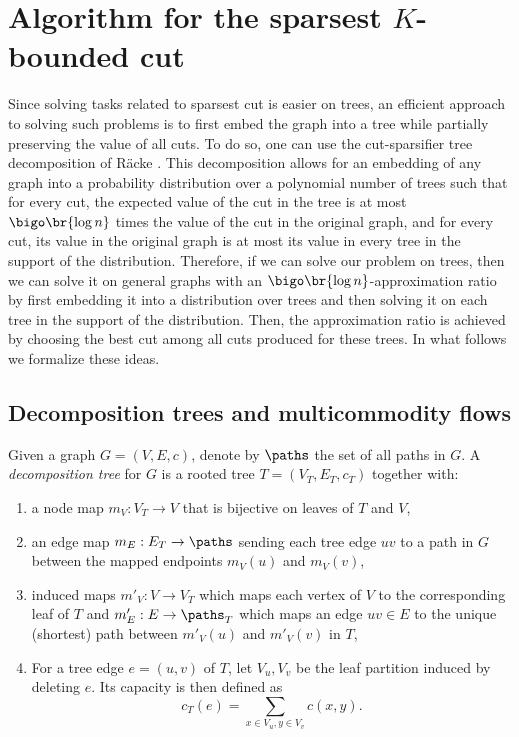 ﻿\section{Algorithm for the sparsest $K$-bounded cut}
\label{sec:alpha}

Since solving tasks related to sparsest cut is easier on trees, an efficient approach to solving such problems is to first embed the graph into a tree while partially preserving the value of all cuts. To do so, one can use the cut-sparsifier tree decomposition of R\"{a}cke \cite{OptimalHierarchicalDecompositionsForCongestionMinimizationInNetworks}. This decomposition allows for an embedding of any graph into a probability distribution over a polynomial number of trees such that for every cut, the expected value of the cut in the tree is at most $\bigo\br{\log n}$ times the value of the cut in the original graph, and for every cut, its value in the original graph is at most its value in every tree in the support of the distribution. Therefore, if we can solve our problem on trees, then we can solve it on general graphs with an $\bigo\br{\log n}$-approximation ratio by first embedding it into a distribution over trees and then solving it on each tree in the support of the distribution. Then, the approximation ratio is achieved by choosing the best cut among all cuts produced for these trees. In what follows we formalize these ideas.


\subsection{Decomposition trees and multicommodity flows}
Given a graph $G=(V,E,c)$, denote by $\paths$ the set of all paths in $G$.
A \emph{decomposition tree} for $G$ is a rooted tree
$T=(V_T,E_T, c_T)$ together with:
\begin{enumerate}
  \item a node map $m_V:V_T\to V$ that is bijective on leaves of $T$ and $V$,
  \item an edge map $m_E:E_T\to \paths$ sending each tree edge $uv$ to a path in $G$
  between the mapped endpoints $m_V(u)$ and $m_V(v)$,
  \item induced maps $m'_V:V\to V_T$ which maps each vertex of $V$ to the corresponding leaf of $T$ and $m'_E:E\to \paths_T$ which maps an edge $uv\in E$ to the unique (shortest) path between $m'_V(u)$ and $m'_V(v)$ in $T$,
  \item For a tree edge $e=(u,v)$ of $T$, let $V_{u},V_{v}$ be the leaf partition
induced by deleting $e$. Its capacity is then defined as
\[
  c_T(e)=\sum_{x\in V_{u}, y\in V_{v}} c(x,y).
\]
\end{enumerate}


